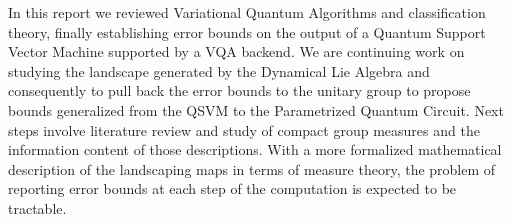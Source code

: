 
In this report we reviewed Variational Quantum Algorithms and classification
theory, finally establishing error bounds on the output of a Quantum Support
Vector Machine supported by a VQA backend. We are continuing work on studying
the landscape generated by the Dynamical Lie Algebra and consequently to pull
back the error bounds to the unitary group to propose bounds generalized from
the QSVM to the Parametrized Quantum Circuit. Next steps involve literature
review and study of compact group measures and the information content of those
descriptions. With a more formalized mathematical description of the landscaping
maps in terms of measure theory, the problem of reporting error bounds at each
step of the computation is expected to be tractable.